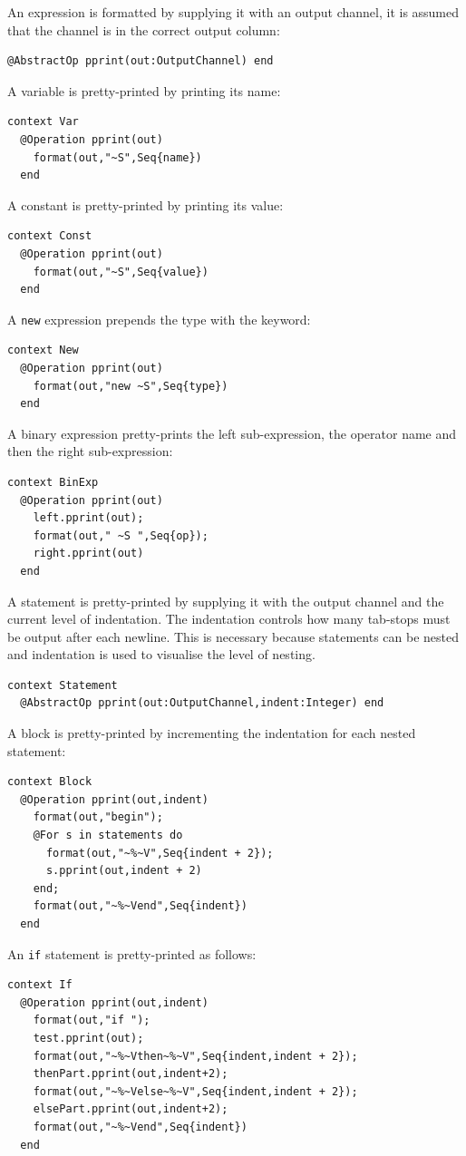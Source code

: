 \documentclass{article}
\begin{document}
An expression is formatted by supplying it with an output channel, it is assumed
that the channel is in the correct output column:
\begin{verbatim}
@AbstractOp pprint(out:OutputChannel) end
\end{verbatim}
A variable is pretty-printed by printing its name:
\begin{verbatim}
context Var
  @Operation pprint(out)
    format(out,"~S",Seq{name})
  end
\end{verbatim}
A constant is pretty-printed by printing its value:
\begin{verbatim}
context Const
  @Operation pprint(out)
    format(out,"~S",Seq{value})
  end
\end{verbatim}
A {\tt new} expression prepends the type with the keyword:
\begin{verbatim}
context New
  @Operation pprint(out)
    format(out,"new ~S",Seq{type})
  end
\end{verbatim}
A binary expression pretty-prints the left sub-expression, the operator
name and then the right sub-expression:
\begin{verbatim}
context BinExp
  @Operation pprint(out)
    left.pprint(out);
    format(out," ~S ",Seq{op});
    right.pprint(out)
  end
\end{verbatim}
A statement is pretty-printed by supplying it with the output channel and the 
current level of indentation. The indentation controls how many tab-stops
must be output after each newline. This is necessary because statements
can be nested and indentation is used to visualise the level of nesting.
\begin{verbatim}
context Statement
  @AbstractOp pprint(out:OutputChannel,indent:Integer) end
\end{verbatim}
A block is pretty-printed by incrementing the indentation for each
nested statement:
\begin{verbatim}
context Block
  @Operation pprint(out,indent)
    format(out,"begin");
    @For s in statements do
      format(out,"~%~V",Seq{indent + 2});
      s.pprint(out,indent + 2)
    end;
    format(out,"~%~Vend",Seq{indent})
  end
\end{verbatim}
An {\tt if} statement is pretty-printed as follows:
\begin{verbatim}
context If
  @Operation pprint(out,indent)
    format(out,"if ");
    test.pprint(out);
    format(out,"~%~Vthen~%~V",Seq{indent,indent + 2});
    thenPart.pprint(out,indent+2);
    format(out,"~%~Velse~%~V",Seq{indent,indent + 2});
    elsePart.pprint(out,indent+2);
    format(out,"~%~Vend",Seq{indent})
  end
\end{verbatim}
\end{document}
